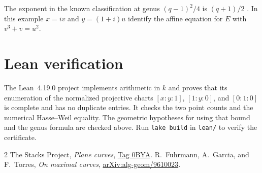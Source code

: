 \documentclass[11pt]{article}
\begin{document}
The exponent in the known classification at genus \((q-1)^2/4\)
is \((q+1)/2\) \cite{fgt}. In this example \(x=iv\) and
\(y=(1+i)u\) identify the affine equation for \(E\) with
\(v^3+v=u^2\).

\section*{Lean verification}

The Lean~4.19.0 project implements arithmetic in \(k\) and proves
that its enumeration of the normalized projective charts
\([x:y:1]\), \([1:y:0]\), and \([0:1:0]\) is complete and has no
duplicate entries. It checks the two point counts and the numerical
Hasse--Weil equality. The geometric hypotheses for using that bound
and the genus formula are checked above. Run \verb|lake build| in
\verb|lean/| to verify the certificate.

\begin{thebibliography}{2}
The Stacks Project, \emph{Plane curves},
\href{https://stacks.math.columbia.edu/tag/0BYA}{Tag 0BYA}.
R.~Fuhrmann, A.~Garcia, and F.~Torres, \emph{On maximal curves},
\href{https://arxiv.org/abs/alg-geom/9610023}{arXiv:alg-geom/9610023}.
\end{thebibliography}
\end{document}
